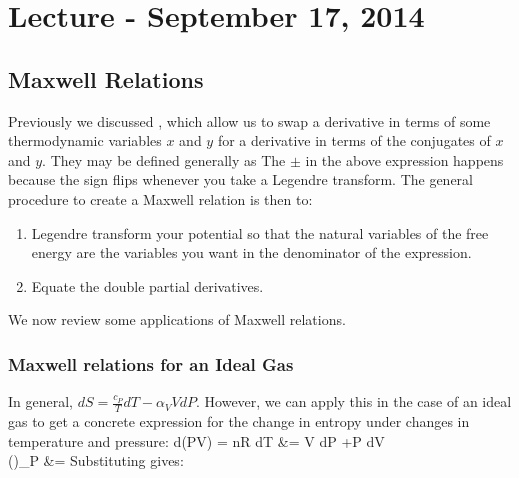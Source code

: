 \documentclass[12pt]{article}
\begin{document}
\section{Lecture - September 17, 2014}
\subsection{Maxwell Relations}
Previously we discussed , which allow us to swap a derivative in terms of some thermodynamic variables $x$ and $y$ for a derivative in terms of the conjugates of $x$ and $y$. They may be defined generally as
\eqs {}
\eqe
The $ \pm $ in the above expression happens because the sign flips whenever you take a Legendre transform. The general procedure to create a Maxwell relation is then to: 
\begin{enumerate}
\item Legendre transform your potential so that the natural variables of the free energy are the variables you want in the denominator of the expression.
\item Equate the double partial derivatives.
\end{enumerate}
We now review some applications of Maxwell relations. 
\subsubsection{Maxwell relations for an Ideal Gas}
In general, $dS = \frac{c_P}{T}dT - \alpha_V V dP$. However, we can apply this in the case of an ideal gas to get a concrete expression for the change in entropy under changes in temperature and pressure:%
\eqs
d(PV) = nR dT &= V dP +P dV\\
\Big(\Big)_P &= 
\eqe
Substituting gives: 
\eqs
{}
\eqe
\end{document}
